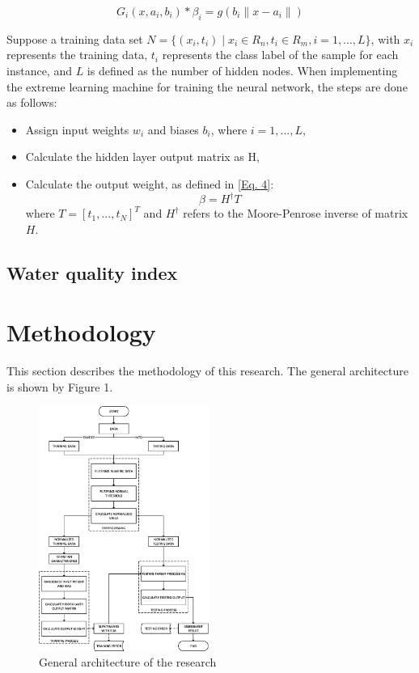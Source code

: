 \documentclass[journal,comsoc]{IEEEtran}
\let\MYoriglatexcaption\caption
\renewcommand{\caption}[2][\relax]{\MYoriglatexcaption[#2]{#2}}
\begin{document}
\begin{equation}
G_{i}(x, a_{i}, b_{i}) * \beta_{i} = g(b_{i}\parallel x - a_{i} \parallel)\label{Eq. 3}
\end{equation}

Suppose a training data set $ N = \{(x_{i},t_{i}) \mid x_{i} \in R_{n}, t_{i} \in R_{m}, i = 1, ..., L\}$, with $x_{i}$ represents the training data, $t_{i}$ represents the class label of the sample for each instance, and $L$ is defined as the number of hidden nodes. When implementing the extreme learning machine for training the neural network, the steps are done as follows:

\begin{itemize}
\item Assign input weights $w_{i}$ and biases $b_{i}$, where $i = 1, ..., L$,
\item Calculate the hidden layer output matrix as H,
\item Calculate the output weight, as defined in \eqref{Eq. 4}:
\begin{equation}
\beta = H^\dagger T\label{Eq. 4}
\end{equation}
where $T = [t_{1},...,t_{N}]^T$ and $H^\dagger$ refers to the Moore-Penrose inverse of matrix $H$.
\end{itemize}

\subsection{Water quality index}



\section{Methodology}

This section describes the methodology of this research. The general architecture is shown by Figure 1.

\begin{figure}[th]
	\centering
	\includegraphics[height=8cm]{ArsitekturUmum-Redesigned-Remastered.eps}
	\caption{General architecture of the research}
\end{figure}
\end{document}
